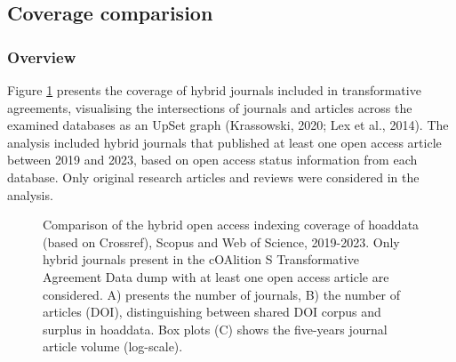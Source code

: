 \documentclass[a4paper,man,floatsintext,longtable,noextraspace,10pt]{apa6}
\begin{document}
\subsection{Coverage comparision}\label{coverage-comparision}

\subsubsection{Overview}\label{overview}

Figure \ref{fig-upset_coverage_results} presents the coverage of hybrid
journals included in transformative agreements, visualising the
intersections of journals and articles across the examined databases as
an UpSet graph (Krassowski, 2020; Lex et al., 2014). The analysis
included hybrid journals that published at least one open access article
between 2019 and 2023, based on open access status information from each
database. Only original research articles and reviews were considered in
the analysis.

\begin{figure}[ht!]


\caption{\label{fig-upset_coverage_results}Comparison of the hybrid open
access indexing coverage of hoaddata (based on Crossref), Scopus and Web
of Science, 2019-2023. Only hybrid journals present in the cOAlition S
Transformative Agreement Data dump with at least one open access article
are considered. A) presents the number of journals, B) the number of
articles (DOI), distinguishing between shared DOI corpus and surplus in
hoaddata. Box plots (C) shows the five-years journal article volume
(log-scale).}

\end{figure}%
\end{document}
